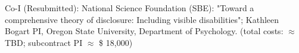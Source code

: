\item Co-I (Resubmitted): National Science Foundation (SBE): "Toward a comprehensive theory of disclosure: Including visible disabilities"; Kathleen Bogart PI, Oregon State University, Department of Psychology.  (total costs: $\approx$ TBD; subcontract PI $\approx$ \$ 18,000) 





%
%
